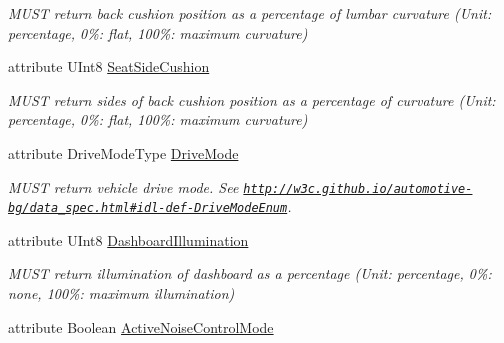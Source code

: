 \begin{DoxyCompactItemize}
\begin{DoxyCompactList}\small\item\em M\+U\+S\+T return back cushion position as a percentage of lumbar curvature (Unit\+: percentage, 0\%\+: flat, 100\%\+: maximum curvature) \end{DoxyCompactList}\item 
\hypertarget{interfaceVehiclePropertyType_a4156acb1aaf01a178d12ffbd0a513f2f}{attribute U\+Int8 \hyperlink{interfaceVehiclePropertyType_a4156acb1aaf01a178d12ffbd0a513f2f}{Seat\+Side\+Cushion}}\label{interfaceVehiclePropertyType_a4156acb1aaf01a178d12ffbd0a513f2f}

\begin{DoxyCompactList}\small\item\em M\+U\+S\+T return sides of back cushion position as a percentage of curvature (Unit\+: percentage, 0\%\+: flat, 100\%\+: maximum curvature) \end{DoxyCompactList}\item 
\hypertarget{interfaceVehiclePropertyType_a45038c577f25a2eb7fc7f95a32ca753f}{attribute Drive\+Mode\+Type \hyperlink{interfaceVehiclePropertyType_a45038c577f25a2eb7fc7f95a32ca753f}{Drive\+Mode}}\label{interfaceVehiclePropertyType_a45038c577f25a2eb7fc7f95a32ca753f}

\begin{DoxyCompactList}\small\item\em M\+U\+S\+T return vehicle drive mode. See \href{http://w3c.github.io/automotive-bg/data_spec.html#idl-def-DriveModeEnum}{\tt http\+://w3c.\+github.\+io/automotive-\/bg/data\+\_\+spec.\+html\#idl-\/def-\/\+Drive\+Mode\+Enum}. \end{DoxyCompactList}\item 
\hypertarget{interfaceVehiclePropertyType_a544743c3673a2878489b5e6585eac22f}{attribute U\+Int8 \hyperlink{interfaceVehiclePropertyType_a544743c3673a2878489b5e6585eac22f}{Dashboard\+Illumination}}\label{interfaceVehiclePropertyType_a544743c3673a2878489b5e6585eac22f}

\begin{DoxyCompactList}\small\item\em M\+U\+S\+T return illumination of dashboard as a percentage (Unit\+: percentage, 0\%\+: none, 100\%\+: maximum illumination) \end{DoxyCompactList}\item 
\hypertarget{interfaceVehiclePropertyType_aaa41506b53934ad248298ae8bd3de3d9}{attribute Boolean \hyperlink{interfaceVehiclePropertyType_aaa41506b53934ad248298ae8bd3de3d9}{Active\+Noise\+Control\+Mode}}\label{interfaceVehiclePropertyType_aaa41506b53934ad248298ae8bd3de3d9}


\end{DoxyCompactItemize}
